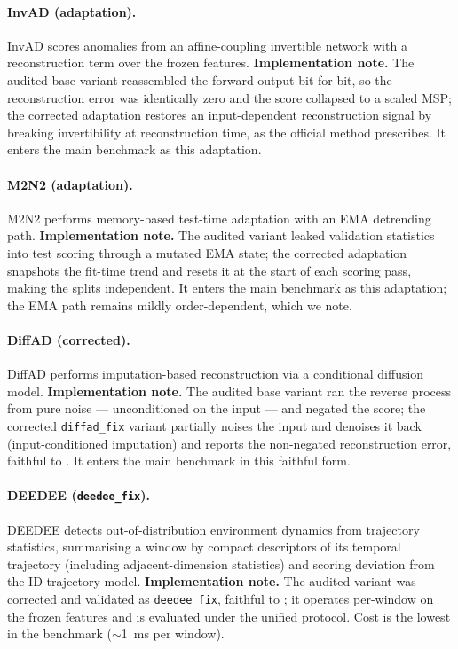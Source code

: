 \documentclass[11pt]{article}
\begin{document}
\paragraph{InvAD (adaptation).}
InvAD \citep{InvAD2025} scores anomalies from an affine-coupling invertible network
with a reconstruction term over the frozen features. \textbf{Implementation note.}
The audited base variant reassembled the forward output bit-for-bit, so the
reconstruction error was identically zero and the score collapsed to a scaled MSP;
the corrected adaptation restores an input-dependent reconstruction signal by
breaking invertibility at reconstruction time, as the official method prescribes. It
enters the main benchmark as this adaptation.

\paragraph{M2N2 (adaptation).}
M2N2 \citep{M2N22024} performs memory-based test-time adaptation with an EMA
detrending path. \textbf{Implementation note.} The audited variant leaked validation
statistics into test scoring through a mutated EMA state; the corrected adaptation
snapshots the fit-time trend and resets it at the start of each scoring pass, making
the splits independent. It enters the main benchmark as this adaptation; the EMA path
remains mildly order-dependent, which we note.

\paragraph{DiffAD (corrected).}
DiffAD \citep{Xiao2023} performs imputation-based reconstruction via a conditional
diffusion model. \textbf{Implementation note.} The audited base variant ran the
reverse process from pure noise --- unconditioned on the input --- and negated the
score; the corrected \texttt{diffad\_fix} variant partially noises the input and
denoises it back (input-conditioned imputation) and reports the non-negated
reconstruction error, faithful to \citet{Xiao2023}. It enters the main benchmark in
this faithful form.

\paragraph{DEEDEE (\texttt{deedee\_fix}).}
DEEDEE \citep{DEEDEE2025} detects out-of-distribution environment dynamics from
trajectory statistics, summarising a window by compact descriptors of its temporal
trajectory (including adjacent-dimension statistics) and scoring deviation from the
ID trajectory model. \textbf{Implementation note.} The audited variant was corrected
and validated as \texttt{deedee\_fix}, faithful to \citet{DEEDEE2025}; it operates
per-window on the frozen features and is evaluated under the unified protocol. Cost is
the lowest in the benchmark ($\sim$\SI{1}{\milli\second} per window).
\end{document}
